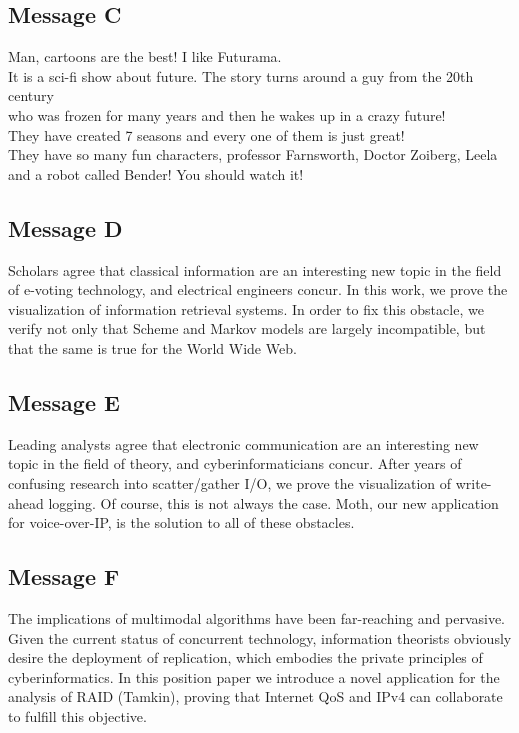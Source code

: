 \documentclass[a4paper,10pt]{article}
\begin{document}
\begin{appendices}
\subsection{Message C}
Man, cartoons are the best! I like Futurama.\\
It is a sci-fi show about future. The story turns around a guy from the 20th century\\
who was frozen for many years and then he wakes up in a crazy future!\\
They have created 7 seasons and every one of them is just great!\\
They have so many fun characters, professor Farnsworth, Doctor Zoiberg, Leela\\
and a robot called Bender! You should watch it!\\

\subsection{Message D}
Scholars agree that classical information are an interesting new topic in the field of e-voting technology, and electrical engineers concur. In this work, we prove the visualization of information retrieval systems. In order to fix this obstacle, we verify not only that Scheme and Markov models are largely incompatible, but that the same is true for the World Wide Web. 

\subsection{Message E}
Leading analysts agree that electronic communication are an interesting new topic in the field of theory, and cyberinformaticians concur. After years of confusing research into scatter/gather I/O, we prove the visualization of write-ahead logging. Of course, this is not always the case. Moth, our new application for voice-over-IP, is the solution to all of these obstacles. 


\subsection{Message F}
The implications of multimodal algorithms have been far-reaching and pervasive. Given the current status of concurrent technology, information theorists obviously desire the deployment of replication, which embodies the private principles of cyberinformatics. In this position paper we introduce a novel application for the analysis of RAID (Tamkin), proving that Internet QoS and IPv4 can collaborate to fulfill this objective. 


\end{appendices}
\end{document}
